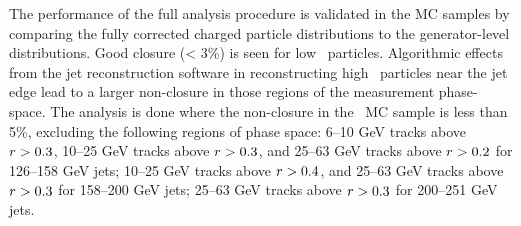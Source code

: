 The performance of the full analysis procedure is validated in the MC samples by comparing the fully corrected charged particle distributions to the generator-level distributions. Good closure (< 3\%) is seen for low \pt\ particles. Algorithmic effects from the jet reconstruction software in reconstructing high \pt\ particles near the jet edge lead to a larger non-closure in those regions of the measurement phase-space. The analysis is done where the non-closure in the \pp\ MC sample is less than 5\%, excluding the following regions of phase space: 6--10 GeV tracks above $\mbox{$r$} > 0.3$, 10--25 GeV tracks above $\mbox{$r$} > 0.3$, and 25--63 GeV tracks above $\mbox{$r$} > 0.2$ for 126--158 GeV jets; 10--25 GeV tracks above $\mbox{$r$} > 0.4$, and 25--63 GeV tracks above $\mbox{$r$} > 0.3$ for 158--200 GeV jets; 25--63 GeV tracks above $\mbox{$r$} > 0.3$ for 200--251 GeV jets.



